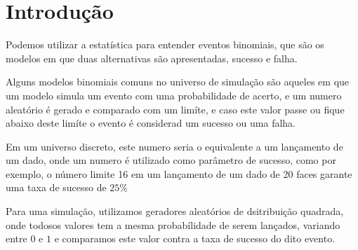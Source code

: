 \chapter{Introdu\c{c}\~{a}o}
Podemos utilizar a estat\'{i}stica para entender eventos binomiais, que s\~{a}o os modelos
em que duas alternativas s\~{a}o apresentadas, sucesso e falha.

Alguns modelos binomiais comuns no universo de simula\c{c}\~{a}o
s\~{a}o aqueles em que um modelo simula um evento com uma probabilidade de acerto,
e um numero aleat\'{o}rio \'{e} gerado e comparado com um lim\'{i}te, e caso este valor passe ou
fique abaixo deste lim\'{i}te o evento \'{e} considerad um sucesso ou uma falha.

Em um universo discreto, este numero seria o equivalente a um lan\c{c}amento de um dado,
onde um numero \'{e} utilizado como par\^{a}metro de sucesso, como por exemplo, o número limite 16
em um lan\c{c}amento de um dado de 20 faces garante uma taxa de sucesso de $25\%$

Para uma simula\c{c}\~{a}o, utilizamos geradores aleat\'{o}rios de dsitribui\c{c}\~{a}o quadrada, onde
todosos valores tem a mesma probabílidade de serem lan\c{c}ados, variando entre $0$ e $1$
e comparamos este valor contra a taxa de sucesso do dito evento.
